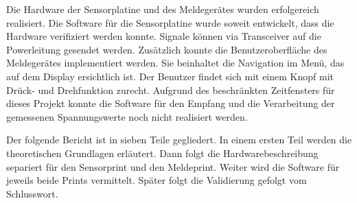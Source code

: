 Die Hardware der Sensorplatine und des Meldegerätes wurden erfolgereich realisiert. Die Software für die Sensorplatine wurde soweit entwickelt, dass die Hardware verifiziert werden konnte. Signale können via Transceiver auf die Powerleitung gesendet werden. Zusätzlich konnte die Benutzeroberfläche des Meldegerätes implementiert werden. Sie beinhaltet die Navigation im Menü, das auf dem Display ersichtlich ist. Der Benutzer findet sich mit einem Knopf mit Drück- und Drehfunktion zurecht. Aufgrund des beschränkten Zeitfensters für dieses Projekt konnte die Software für den Empfang und die Verarbeitung der gemessenen Spannungswerte noch nicht realisiert werden.

Der folgende Bericht ist in sieben Teile gegliedert. In einem ersten Teil werden die theoretischen Grundlagen erläutert. Dann folgt die Hardwarebeschreibung separiert für den Sensorprint und den Meldeprint. Weiter wird die Software für jeweils beide Prints vermittelt. Später folgt die Validierung gefolgt vom Schlusswort.